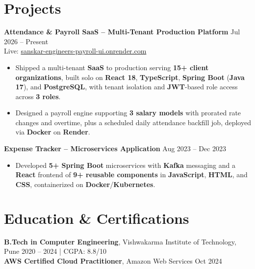 \documentclass[letterpaper,10pt]{article}
\begin{document}
\section*{Projects}

\textbf{Attendance \& Payroll SaaS -- Multi-Tenant Production Platform} \hfill Jul 2026 -- Present \\
Live: \href{https://sanskar-engineers-payroll-ui.onrender.com/login}{sanskar-engineers-payroll-ui.onrender.com}
\begin{itemize}
    \item Shipped a multi-tenant \textbf{SaaS} to production serving \textbf{15+ client organizations}, built solo on \textbf{React 18}, \textbf{TypeScript}, \textbf{Spring Boot} (\textbf{Java 17}), and \textbf{PostgreSQL}, with tenant isolation and \textbf{JWT}-based role access across \textbf{3 roles}.
    \item Designed a payroll engine supporting \textbf{3 salary models} with prorated rate changes and overtime, plus a scheduled daily attendance backfill job, deployed via \textbf{Docker} on \textbf{Render}.
\end{itemize}

\textbf{Expense Tracker -- Microservices Application} \hfill Aug 2023 -- Dec 2023
\begin{itemize}
    \item Developed \textbf{5+ Spring Boot} microservices with \textbf{Kafka} messaging and a \textbf{React} frontend of \textbf{9+ reusable components} in \textbf{JavaScript}, \textbf{HTML}, and \textbf{CSS}, containerized on \textbf{Docker}/\textbf{Kubernetes}.
\end{itemize}

\section*{Education \& Certifications}
\textbf{B.Tech in Computer Engineering}, Vishwakarma Institute of Technology, Pune \hfill 2020 -- 2024 \;|\; CGPA: 8.8/10 \\
\textbf{AWS Certified Cloud Practitioner}, Amazon Web Services \hfill Oct 2024
\end{document}
